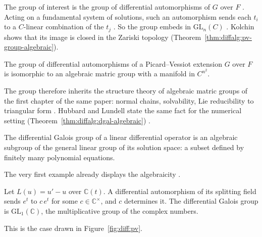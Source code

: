 The group of interest is the group of differential automorphisms of $G$
over $F$ \cite[pp.~29--31]{Kolchin1948PicardVessiot}. Acting on a
fundamental system of solutions, such an automorphism sends each $t_i$ to
a $C$-linear combination of the $t_j$ \cite[p.~29]{Kolchin1948PicardVessiot}.
So the group embeds in $\mathrm{GL}_n(C)$
\cite[p.~29]{Kolchin1948PicardVessiot}. Kolchin shows that its image is
closed in the Zariski topology (Theorem~\ref{thm:diffalg:pv-group-algebraic}).

\begin{theorem}\label{thm:diffalg:pv-group-algebraic}
The group of differential automorphisms of a Picard--Vessiot extension
$G$ over $F$ is isomorphic to an algebraic matric group with a manifold
in $C^{n^2}$.
\end{theorem}

The group therefore inherits the structure theory of algebraic matric
groups of the first chapter of the same paper: normal chains, solvability,
Lie reducibility to triangular form
\cite[pp.~16--24]{Kolchin1948PicardVessiot}. Hubbard and Lundell state
the same fact for the numerical setting (Theorem~\ref{thm:diffalg:dgal-algebraic})
\cite[p.~250]{HubbardLundell2011}.\begin{theorem}\label{thm:diffalg:dgal-algebraic}
The differential Galois group of a linear differential operator is an
algebraic subgroup of the general linear group of its solution space:
a subset defined by finitely many polynomial equations.
\end{theorem}

The very first example already displays the algebraicity
\cite[pp.~249--250]{HubbardLundell2011}.

\begin{example}\label{ex:diffalg:exp}
Let $L(u) = u' - u$ over $\mathbb{C}(t)$. A differential automorphism of
its splitting field sends $e^t$ to $c\,e^t$ for some
$c\in\mathbb{C}^{\times}$, and $c$ determines it. The differential Galois
group is $\mathrm{GL}_1(\mathbb{C})$, the multiplicative group of the
complex numbers.
\end{example}

This is the case drawn in Figure~\ref{fig:diff:pv}.

